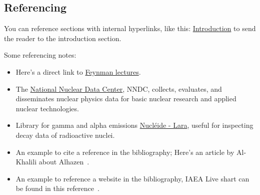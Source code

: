 \documentclass[a4paper, twocolumn]{article}
\newcommand\wordcount{
    \immediate\write18{texcount -sub=section \jobname.tex  | grep "Section" | sed -e 's/+.*//' | sed -n \thesection p > 'count.txt'}
(words)}
\begin{document}
 
 
\subsection{Referencing}
You can reference sections with internal hyperlinks, like this: \hyperref[sec:introduction]{\color{blue} Introduction} to send the reader to the introduction section.

Some referencing notes: 
\begin{itemize}[noitemsep, topsep=0pt] %
	\item Here's a direct link to \href{https://www.feynmanlectures.caltech.edu/}{Feynman lectures}.
    \item The \href{https://www.nndc.bnl.gov/}{National Nuclear Data Center}, NNDC, collects, evaluates, and disseminates nuclear physics data for basic nuclear research and applied nuclear technologies.
    \item Library for gamma and alpha emissions \href{http://www.lnhb.fr/Laraweb/index.php}{Nucléide - Lara}, useful for inspecting decay data of radioactive nuclei.
	\item An example to cite a reference in the bibliography; Here's an article by Al-Khalili about Alhazen~\cite{alkhalili2015}.
	\item An example to reference a website in the bibliography, IAEA Live shart can be found in this reference~\cite{websiteiaea}.
\end{itemize}



\end{document}
